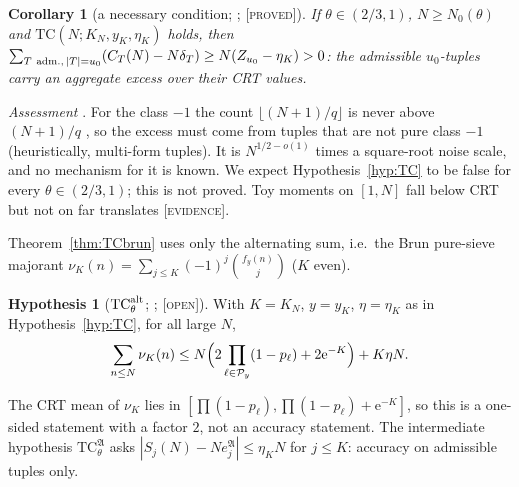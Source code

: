 \documentclass[10pt,reqno]{amsart}
\newtheorem{corollary}[theorem]{Corollary}
\theoremstyle{definition}
\newtheorem{hypothesis}[theorem]{Hypothesis}
\theoremstyle{remark}
\newcommand{\cP}{\mathcal P}
\newcommand{\e}{\mathrm e}
\newcommand{\lab}[1]{\textup{[\textsc{#1}]}}
\begin{document}
\begin{corollary}[a necessary condition; {\cite[Cor.~2.3]{TU2}}; \lab{proved}]\label{cor:TCexcess}
If $\theta\in(2/3,1)$, $N\geq N_0(\theta)$ and $\mathrm{TC}(N;K_N,y_K,\eta_K)$ holds, then
$\sum_{T\ {\rm adm.},\,|T|=u_0}(C_T(N)-N\delta_T)\geq N(Z_{u_0}-\eta_K)>0$: the admissible
$u_0$-tuples carry an aggregate excess over their CRT values.
\end{corollary}
\emph{Assessment} \cite[Ass.~3.2]{TU2}.  For the class $-1$ the count
$\lfloor(N+1)/q\rfloor$ is never above $(N+1)/q$ \cite[Lemma~3.1]{TU2}, so the
excess must come from tuples that are not pure class $-1$ (heuristically,
multi-form tuples).  It is $N^{1/2-o(1)}$ times a
square-root noise scale, and no mechanism for it is known.  We expect
Hypothesis~\ref{hyp:TC} to be false for every $\theta\in(2/3,1)$; this is not
proved.  Toy moments on $[1,N]$ fall below CRT but not on far translates
\cite[\S5]{TU2} \lab{evidence}.

Theorem~\ref{thm:TCbrun} uses only the alternating sum, i.e.\ the Brun
pure-sieve majorant $\nu_K(n)=\sum_{j\leq K}(-1)^j\binom{f_y(n)}j$ ($K$ even).

\begin{hypothesis}[$\mathrm{TC}^{\rm alt}_\theta$; {\cite[\S4]{TU2}}; \lab{open}]\label{hyp:TCalt}
With $K=K_N$, $y=y_K$, $\eta=\eta_K$ as in Hypothesis~\ref{hyp:TC}, for all large $N$,
\[
 \sum_{n\leq N}\nu_K(n)\leq N\Bigl(2\prod_{\ell\in\cP_y}(1-p_\ell)+2\e^{-K}\Bigr)+K\eta N.
\]
\end{hypothesis}
The CRT mean of $\nu_K$ lies in $[\prod(1-p_\ell),\prod(1-p_\ell)+\e^{-K}]$, so this is a
one-sided statement with a factor $2$, not an accuracy statement.  The
intermediate hypothesis $\mathrm{TC}^{\mathfrak A}_\theta$ asks
$|S_j(N)-Ne_j^{\mathfrak A}|\leq\eta_KN$ for $j\leq K$: accuracy on admissible tuples only.
\end{document}
